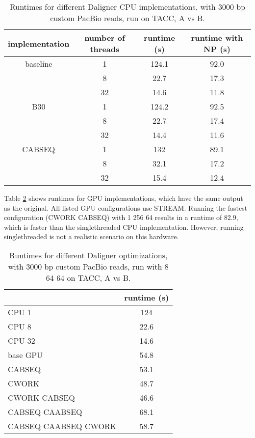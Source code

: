 \documentclass[../main/thesis.tex]{subfiles}
\begin{document}
\begin{table}
\centering
\caption{Runtimes for different Daligner CPU implementations, with 3000 bp custom PacBio reads, run on TACC, A vs B.}
\label{tbl:daligner1}
\begin{tabular}{c c c c}
implementation & number of threads & runtime (s) & runtime with NP (s) \\ \hline
baseline & 1 & 124.1 & 92.0 \\
& 8 & 22.7 & 17.3 \\
& 32 & 14.6 & 11.8 \\ \hline
B30 & 1 & 124.2 & 92.5 \\
& 8 & 22.7 & 17.4 \\
& 32 & 14.4 & 11.6 \\ \hline
CABSEQ & 1 & 132 & 89.1 \\
& 8 & 32.1 & 17.2 \\
& 32 & 15.4 & 12.4 \\
\end{tabular}
\end{table}

Table \ref{tbl:daligner2} shows runtimes for GPU implementations, which have the same output as the original.
All listed GPU configurations use STREAM.
Running the fastest configuration (CWORK CABSEQ) with 1 256 64 results in a runtime of 82.9, which is faster than the singlethreaded CPU implementation.
However, running singlethreaded is not a realistic scenario on this hardware.

\begin{table}
\centering
\caption{Runtimes for different Daligner optimizations, with 3000 bp custom PacBio reads, run with 8 64 64 on TACC, A vs B.}
\label{tbl:daligner2}
\begin{tabular}{l c}
& runtime (s) \\ \hline
CPU 1 & 124 \\
CPU 8 & 22.6 \\
CPU 32 & 14.6 \\
base GPU & 54.8 \\ 
CABSEQ & 53.1 \\
CWORK & 48.7 \\
CWORK CABSEQ & 46.6 \\
CABSEQ CAABSEQ & 68.1 \\
CABSEQ CAABSEQ CWORK & 58.7 \\ \hline
\end{tabular}
\end{table}
\end{document}
